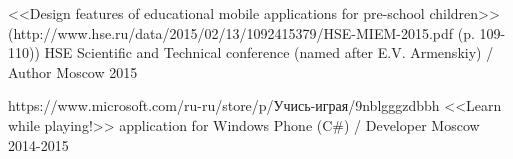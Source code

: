 \begin{cventries}
\cventry
{<<Design features of educational mobile applications for pre-school children>> (http://www.hse.ru/data/2015/02/13/1092415379/HSE-MIEM-2015.pdf (p. 109-110))} %
{HSE Scientific and Technical conference (named after E.V. Armenskiy) / Author} %
{Moscow} %
{2015} %
{}


\cventry
{https://www.microsoft.com/ru-ru/store/p/Учись-играя/9nblgggzdbbh} %
{<<Learn while playing!>> application for Windows Phone (C\#) / Developer} %
{Moscow} %
{2014-2015} %
{}
\end{cventries}